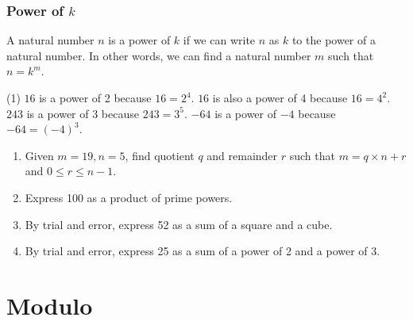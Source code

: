 \begin{frame}
\frametitle{Power of $k$}
\begin{defn}{}{}
A natural number $n$ is a power of $k$ if we can write $n$ as $k$ to the power of a natural number. In other words, we can find a natural number $m$ such that $n = k^m$.
\end{defn}
\begin{ex}
\begin{tasks}(1)
\task $16$ is a power of 2 because $16 = 2^4$.
\task $16$ is also a power of 4 because $16 = 4^2$.
\task $243$ is a power of 3 because $243 = 3^5$.
\task $-64$ is a power of $-4$ because $-64 = (-4)^3$.
\end{tasks}
\end{ex}
\end{frame}

\begin{frame}
\begin{exercisebox}{}{}
\begin{enumerate}
\item Given $m= 19, n =5$, find quotient $q$ and remainder $r$ such that $m = q \times n + r$ and $0 \leq r \leq n-1$.
\item Express 100 as a product of prime powers.
\item By trial and error, express 52 as a sum of a square and a cube.
\item By trial and error, express 25 as a sum of a power of 2 and a power of 3.
\end{enumerate}
\end{exercisebox}
\end{frame}

\section{Modulo}
\frame{\sectionpage}

